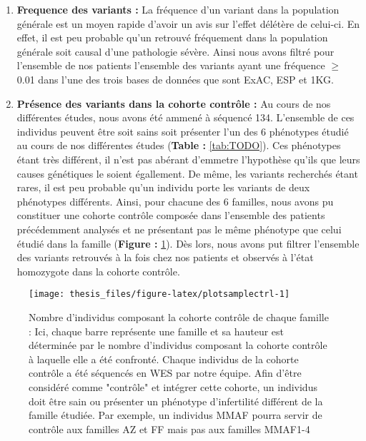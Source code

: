 \documentclass[12pt,twoside]{reedthesis}
\providecommand{\tightlist}{%
  \setlength{\itemsep}{0pt}\setlength{\parskip}{0pt}}
\theoremstyle{definition}
\theoremstyle{definition}
\theoremstyle{remark}
\begin{document}
  \begin{enumerate}
  \def\labelenumi{\arabic{enumi}.}
  \setcounter{enumi}{4}
  \tightlist
  \item
    \textbf{Frequence des variants :} La fréquence d'un variant dans la
    population générale est un moyen rapide d'avoir un avis sur l'effet
    délétère de celui-ci. En effet, il est peu probable qu'un retrouvé
    fréquement dans la population générale soit causal d'une pathologie
    sévère. Ainsi nous avons filtré pour l'ensemble de nos patients
    l'ensemble des variants ayant une fréquence \(\ge\) 0.01 dans l'une
    des trois bases de données que sont ExAC, ESP et 1KG.\\
  \item
    \textbf{Présence des variants dans la cohorte contrôle :} Au cours de
    nos différentes études, nous avons été ammené à séquencé 134.
    L'ensemble de ces individus peuvent être soit sains soit présenter
    l'un des 6 phénotypes étudié au cours de nos différentes études
    (\textbf{Table : }\ref{tab:TODO}). Ces phénotypes étant très
    différent, il n'est pas abérant d'emmetre l'hypothèse qu'ils que leurs
    causes génétiques le soient égallement. De même, les variants
    recherchés étant rares, il est peu probable qu'un individu porte les
    variants de deux phénotypes différents. Ainsi, pour chacune des 6
    familles, nous avons pu constituer une cohorte contrôle composée dans
    l'ensemble des patients précédemment analysés et ne présentant pas le
    même phénotype que celui étudié dans la famille (\textbf{Figure :}
    \ref{fig:plotsamplectrl}). Dès lors, nous avons put filtrer l'ensemble
    des variants retrouvés à la fois chez nos patients et observés à
    l'état homozygote dans la cohorte contrôle.
  \end{enumerate}
  
  \begin{figure}
  
  {\centering \texttt{[image: thesis\_files/figure-latex/plotsamplectrl-1]} 
  
  }
  
  \caption[Nombre d'individus composant la cohorte contrôle de chaque famille]{Nombre d'individus composant la cohorte contrôle de chaque famille : Ici, chaque barre représente une famille et sa hauteur est déterminée par le nombre d'individus composant la cohorte contrôle à laquelle elle a été confronté. Chaque individus de la cohorte contrôle a été séquencés en WES par notre équipe. Afin d'être considéré comme "contrôle" et intégrer cette cohorte, un individus doit être sain ou présenter un phénotype d'infertilité différent de la famille étudiée. Par exemple, un individus MMAF pourra servir de contrôle aux familles AZ et FF mais pas aux familles MMAF1-4}\label{fig:plotsamplectrl}
  \end{figure}
  
\end{document}
